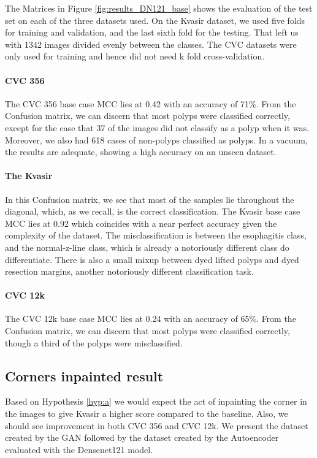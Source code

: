 \noindent
The Matrices in Figure \ref{fig:results_DN121_base} shows the evaluation of the test set on each of the three datasets used. 
On the Kvasir dataset, we used five folds for training and validation, and the last sixth fold for the testing. That left us with 1342 images divided evenly between the classes. The CVC datasets were only used for training and hence did not need k fold cross-validation.

\paragraph{CVC 356}
The CVC 356 base case MCC lies at 0.42 with an accuracy of 71\%. 
From the Confusion matrix, we can discern that most polyps were classified correctly, except for the case that 37 of the images did not classify as a polyp when it was. Moreover, we also had 618 cases of non-polyps classified as polyps.
In a vacuum, the results are adequate, showing a high accuracy on an unseen dataset.  

\paragraph{The Kvasir}
In this Confusion matrix, we see that most of the samples lie throughout the diagonal, which, as we recall, is the correct classification. 
The Kvasir base case MCC lies at 0.92 which coincides with a near perfect accuracy given the complexity of the dataset. 
The misclassification is between the esophagitis class, and the normal-z-line class, which is already a notoriously different class do differentiate.
There is also a small mixup between dyed lifted polyps and dyed resection margins, another notoriously different classification task. 


\paragraph{CVC 12k}
The CVC 12k base case MCC lies at 0.24 with an accuracy of 65\%. 
From the Confusion matrix, we can discern that most polyps were classified correctly, though a third of the polyps were misclassified.




\FloatBarrier
\subsection{Corners inpainted result}
Based on Hypothesis \ref{hyp:a} we would expect the act of inpainting the corner in the images to give Kvasir a higher score compared to the baseline. Also, we should see improvement in both CVC 356 and CVC 12k.
We present the dataset created by the  GAN followed by the dataset created by the Autoencoder evaluated with the Densenet121 model.

